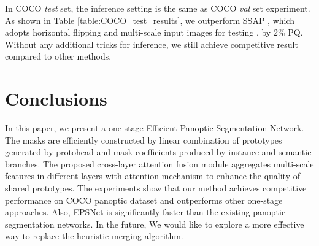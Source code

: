 \documentclass[runningheads]{llncs}
\begin{document}
In COCO \emph{test} set, the inference setting is the same as COCO \emph{val} set experiment. As shown in Table \ref{table:COCO_test_results}, we outperform SSAP \cite{Porzi2019}, which adopts horizontal flipping and multi-scale input images for testing , by 2\% PQ. Without any additional tricks for inference, we still achieve competitive result compared to other methods.

\section{Conclusions}
In this paper, we present a one-stage Efficient Panoptic Segmentation Network. The masks are efficiently constructed by linear combination of prototypes generated by protohead and mask coefficients produced by instance and semantic branches. The proposed cross-layer attention fusion module aggregates multi-scale features in different layers with attention mechanism to enhance the quality of shared prototypes. The experiments show that our method achieves competitive performance on COCO panoptic dataset and outperforms other one-stage approaches. Also, EPSNet is significantly faster than the existing panoptic segmentation networks. 
In the future, We would like to explore a more effective way to replace the heuristic merging algorithm.










\end{document}
